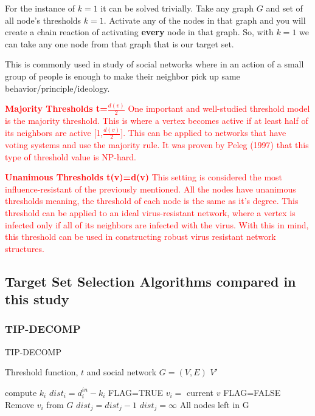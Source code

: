 \begin{enumerate}
For the instance of $k=1$ it can be solved trivially. Take any graph $G$ and set of all node's thresholds $k=1$. Activate any of the nodes in that graph and you will create a chain reaction of activating \textbf{every} node in that graph. So, with $k=1$ we can take any one node from that graph that is our target set.\cite{chen}

This is commonly used in study of social networks where in an action of a small group of people is enough to make their neighbor pick up same behavior/principle/ideology.
	\textcolor{red}{
	\item \textbf{Majority Thresholds t=$\frac{d(v)}{2}$} One important and well-studied threshold model is the majority threshold. This is where a vertex becomes active if at least half of its neighbors are active [1,$\frac{d(v)}{2}$].\cite{chen} This can be applied to networks that have voting systems and use the majority rule. It was proven by Peleg (1997) that this type of threshold value is NP-hard. \cite{majority} }
	
	\textcolor{red}{
	\item \textbf{Unanimous Thresholds t(v)=d(v)} This setting is considered the most influence-resistant of the previously mentioned.\cite{chen} All the nodes have unanimous thresholds meaning, the threshold of each node is the same as it's degree. This threshold can be applied to an ideal virus-resistant network, where a vertex is infected only if all of its neighbors are infected with the virus. With this in mind, this threshold can be used in constructing robust virus resistant network structures.\cite{chen} }
\end{enumerate}

\subsection{Target Set Selection Algorithms compared in this study}

\subsubsection{TIP-DECOMP}
\begin{algorithm}
	\caption{TIP-DECOMP}
	\begin{algorithmic}[1]
		\Require Threshold function, $t$ and social network $G=(V,E)$
		\Ensure $V'$
		
			\State compute $k_{i}$ 
		\EndFor
			\State $dist_{i}=d_{i}^{in}-k_{i} $
		\EndFor
		\State FLAG=TRUE 
					\State $v_{i}=$ current $v$
				\EndIf
			\EndFor
				\State FLAG=FALSE 
			\Else
			\State Remove $v_{i}$ from $G$ 
						\State $dist_{j}=dist_{j}-1$
					\Else
						\State$dist_{j}=\infty$  
					\EndIf
				\EndFor
			\EndIf
		\EndWhile
		\State \Return All nodes left in G 
	\end{algorithmic}
\end{algorithm}

